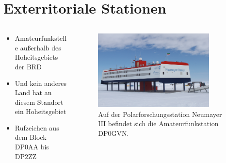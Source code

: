 
\section{Exterritoriale Stationen}
\label{section:exterritoriale_stationen}
\begin{frame}%

\begin{columns}
    \begin{column}{0.48\textwidth}
    \begin{itemize}
  \item Amateurfunkstelle außerhalb des Hoheitsgebiets der BRD
  \item Und kein anderes Land hat an diesem Standort ein Hoheitsgebiet
  \item Rufzeichen aus dem Block DP0AA bis DP2ZZ
  \end{itemize}

    \end{column}
   \begin{column}{0.48\textwidth}
       
\begin{figure}
    \includegraphics[width=0.85\textwidth]{foto/126}
    \caption{\scriptsize Auf der Polarforschungsstation Neumayer III befindet sich die Amateurfunkstation DP0GVN.}
    \label{n_exterritoriale_stationen_neumeyer_station}
\end{figure}

   \end{column}
\end{columns}

\end{frame}

